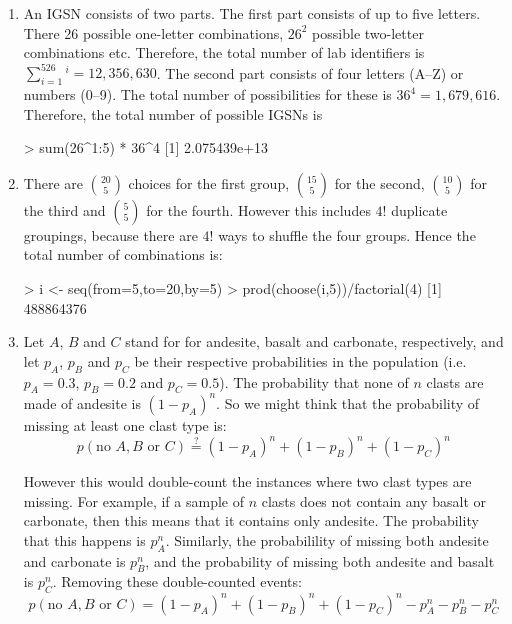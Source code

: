 \begin{enumerate}
  
\item An IGSN consists of two parts. The first part consists of up to
  five letters.  There 26 possible one-letter combinations, $26^2$
  possible two-letter combinations etc. Therefore, the total number of
  lab identifiers is $\sum_{i=1}^526^i=12,356,630$. The second part
  consists of four letters (A--Z) or numbers (0--9). The total number
  of possibilities for these is $36^4=1,679,616$. Therefore, the total
  number of possible IGSNs is

\begin{console}
> sum(26^{1:5}) * 36^4
[1] 2.075439e+13
\end{console}

\item There are $\binom{20}{5}$ choices for the first group,
  $\binom{15}{5}$ for the second, $\binom{10}{5}$ for the third and
  $\binom{5}{5}$ for the fourth. However this includes $4!$ duplicate
  groupings, because there are $4!$ ways to shuffle the four
  groups. Hence the total number of combinations is:

\begin{console}
> i <- seq(from=5,to=20,by=5)
> prod(choose(i,5))/factorial(4)
[1] 488864376
\end{console}

\item Let $A$, $B$ and $C$ stand for for andesite, basalt and
  carbonate, respectively, and let $p_A$, $p_B$ and $p_C$ be their
  respective probabilities in the population (i.e. $p_A=0.3$,
  $p_B=0.2$ and $p_C=0.5$). The probability that none of $n$ clasts
  are made of andesite is $(1-p_A)^n$. So we might think that the
  probability of missing at least one clast type is:
  \[
  p(\mbox{no~}A, B \mbox{~or~}C) \overset{?}{=}
  (1-p_A)^n + (1-p_B)^n + (1-p_C)^n
  \]
  
  However this would double-count the instances where two clast types
  are missing. For example, if a sample of $n$ clasts does not contain
  any basalt or carbonate, then this means that it contains only
  andesite.  The probability that this happens is $p_A^n$. Similarly,
  the probabilility of missing both andesite and carbonate is $p_B^n$,
  and the probability of missing both andesite and basalt is $p_C^n$.
  Removing these double-counted events:
  \[
  p(\mbox{no~}A, B \mbox{~or~}C) =
  (1-p_A)^n + (1-p_B)^n + (1-p_C)^n - p_A^n - p_B^n - p_C^n
  \]


\end{enumerate}

